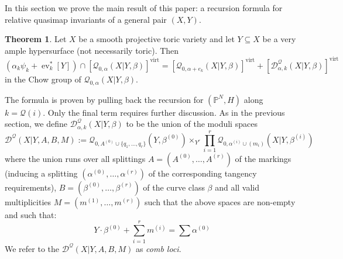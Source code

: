 \documentclass[10pt]{amsart}
\newcommand{\Q}[4]{\mathcal{Q}_{#1,#2}(#3,#4)}
\newcommand{\PP}{\mathbb P}
\newcommand{\virt}[1]{[#1]^{\operatorname{virt}}}
\newcommand{\ev}{\operatorname{ev}}
\newcommand{\om}[1]{\mathcal{#1}}
\theoremstyle{definition}
\newtheorem{thm}{Theorem}[section]
\theoremstyle{definition}
\begin{document}
In this section we prove the main result of this paper: a recursion formula for relative quasimap invariants of a general pair $(X,Y)$.  

\begin{thm} \label{Theorem general recursion} Let $X$ be a smooth projective toric variety and let $Y \subseteq X$ be a very ample hypersurface (not necessarily toric). Then
\begin{equation*} (\alpha_k \psi_k + \ev_k^* [Y]) \cap \virt{\Q{0}{\alpha}{X|Y}{\beta}} = \virt{\Q{0}{\alpha+e_k}{X|Y}{\beta}} + \virt{\mathcal D^\mathcal{Q}_{\alpha,k}(X|Y,\beta)} \end{equation*}
in the Chow group of $\Q{0}{\alpha}{X|Y}{\beta}$. 
\end{thm}

The formula is proven by pulling back the recursion for $(\PP^N,H)$ along $k=\om{Q}(i)$. Only the final term requires further discussion. As in the previous section, we define $\mathcal D^\mathcal{Q}_{\alpha,k}(X|Y,\beta)$ to be the union of the moduli spaces
\begin{equation*} \mathcal D^{\mathcal{Q}}(X|Y,A,B,M) := \Q{0}{A^{(0)} \cup \{q_1, \ldots, q_r\}}{Y}{\beta^{(0)}} \times_{Y^r} \prod_{i=1}^r \Q{0}{\alpha^{(i)}\cup (m_i)}{X|Y}{\beta^{(i)}} \end{equation*}
where the union runs over all splittings $A = (A^{(0)},\ldots,A^{(r)})$ of the markings (inducing a splitting $(\alpha^{(0)}, \ldots, \alpha^{(r)})$ of the corresponding tangency requirements), $B = (\beta^{(0)}, \ldots, \beta^{(r)})$ of the curve class $\beta$ and all valid multiplicities $M = (m^{(1)}, \ldots, m^{(r)})$ such that the above spaces are non-empty and such that:
\[
Y \cdot \beta^{(0)} +\sum_{i=1}^r m^{(i)}=\sum \alpha^{(0)}
\]
We refer to the $\mathcal D^{\mathcal{Q}}(X|Y,A,B,M)$ as \emph{comb loci}.
\end{document}
